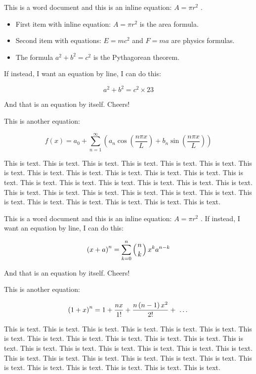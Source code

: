 \documentclass[11pt,a4paper]{article}
\begin{document}
This is a word document and this is an inline equation:  $A= \pi r^{2}$ .

\begin{itemize}
\item First item with inline equation:  $A= \pi r^{2}$ is the area formula.
\item Second item with equations:  $E=mc^{2}$  and  $F=ma$ are physics formulas.
\item The formula  $a^{2}+b^{2}=c^{2}$ is the Pythagorean theorem.
\end{itemize}

If instead, I want an equation by line, I can do this:

$$a^{2}+b^{2}=c^{2} \times 23$$

And that is an equation by itself. Cheers!

This is another equation:

$$f\left(x\right)=a_{0}+\sum_{n=1}^{ \infty }\left(a_{n}\cos(\frac{n \pi x}{L})+b_{n}\sin(\frac{n \pi x}{L})\right)$$

This is text. This is text. This is text. This is text. This is text. This is text. This is text. This is text. This is text. This is text. This is text. This is text. This is text. This is text. This is text. This is text. This is text. This is text. This is text. This is text. This is text. This is text. This is text. This is text. This is text. This is text. This is text. This is text. This is text. This is text. This is text.

This is a word document and this is an inline equation:  $A= \pi r^{2}$ . If instead, I want an equation by line, I can do this:

$$\left(x+a\right)^{n}=\sum_{k=0}^{n}\left(\genfrac{}{}{0pt}{}{n}{k}\right)x^{k}a^{n-k}$$

And that is an equation by itself. Cheers!

This is another equation:

$$\left(1+x\right)^{n}=1+\frac{nx}{1!}+\frac{n\left(n-1\right)x^{2}}{2!}+ \text{ \textellipsis }$$

This is text. This is text. This is text. This is text. This is text. This is text. This is text. This is text. This is text. This is text. This is text. This is text. This is text. This is text. This is text. This is text. This is text. This is text. This is text. This is text. This is text. This is text. This is text. This is text. This is text. This is text. This is text. This is text. This is text. This is text. This is text.
\end{document}
